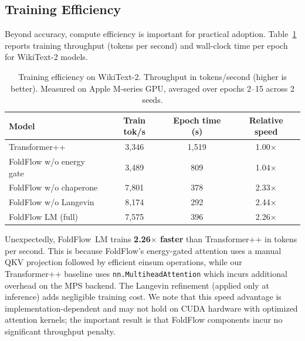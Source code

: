 \documentclass[10pt]{article}
\begin{document}
\subsection{Training Efficiency}
\label{sec:efficiency}

Beyond accuracy, compute efficiency is important for practical adoption.
Table~\ref{tab:throughput} reports training throughput (tokens per
second) and wall-clock time per epoch for WikiText-2 models.

\begin{table}[t]
\centering
\caption{Training efficiency on WikiText-2.  Throughput in tokens/second
  (higher is better).  Measured on Apple M-series GPU, averaged over
  epochs 2--15 across 2 seeds.}
\label{tab:throughput}
\small
\begin{tabular}{@{}lccc@{}}
\toprule
Model & Train tok/s & Epoch time (s) & Relative speed \\
\midrule
Transformer++           & 3,346 & 1,519 & 1.00$\times$ \\
FoldFlow w/o energy gate & 3,489 & 809 & 1.04$\times$\footnotemark \\
FoldFlow w/o chaperone  & 7,801 & 378 & 2.33$\times$ \\
FoldFlow w/o Langevin   & 8,174 & 292 & 2.44$\times$ \\
FoldFlow LM (full)      & 7,575 & 396 & 2.26$\times$ \\
\bottomrule
\end{tabular}
\end{table}


Unexpectedly, FoldFlow~LM trains \textbf{2.26$\times$ faster} than
Transformer++ in tokens per second.  This is because FoldFlow's
energy-gated attention uses a manual QKV projection followed by
efficient einsum operations, while our Transformer++ baseline uses
\texttt{nn.MultiheadAttention} which incurs additional overhead on
the MPS backend.  The Langevin refinement (applied only at inference)
adds negligible training cost.  We note that this speed advantage is
implementation-dependent and may not hold on CUDA hardware with
optimized attention kernels; the important result is that FoldFlow
components incur no significant throughput penalty.
\end{document}
